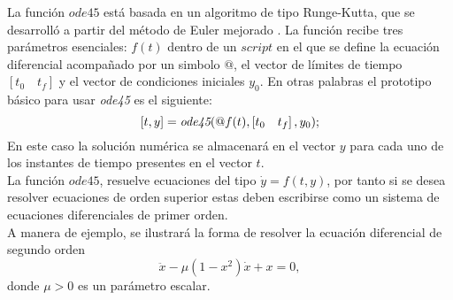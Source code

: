 \newpage
{}\label{anexoB}
\noindent La función $ode45$ está basada en un algoritmo de tipo Runge-Kutta, que se desarrolló a partir del método de Euler mejorado \citep{chapra2003metodos}. La función recibe tres parámetros esenciales: $f(t)$ dentro de un $script$ en el que se define la ecuación diferencial acompañado por un simbolo $@$, el vector de límites de tiempo $\left[ t_0 \quad t_f \right]$ y el vector de condiciones iniciales $y_0$. En otras palabras el prototipo básico para usar \emph{ode45} es el siguiente:
\begin{equation}\label{defode}
   [t,y]=\emph{ode45}(@f(t),\left[ t_0 \quad t_f \right],y_0);
    \end{equation}
En este caso la solución numérica se almacenará en el vector $y$  para cada uno de los instantes de tiempo presentes en el vector $t$.\\

La función $ode45$, resuelve ecuaciones del tipo $\dot{y} = f(t,y)$, por tanto si se desea resolver ecuaciones de orden superior estas deben escribirse como un sistema de ecuaciones diferenciales de primer orden.\\

A manera de ejemplo, se ilustrará la forma de resolver la ecuación diferencial de segundo orden
\begin{equation}\label{segundo}
   \ddot{x}-\mu\left(1-x^2\right)\dot{x}+x=0,
\end{equation}
donde $\mu > 0$ es un parámetro escalar.\\

